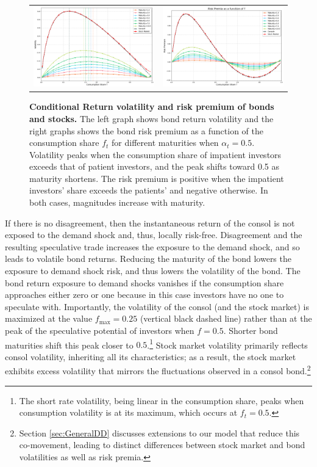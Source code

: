 \documentclass[preprint,11pt,authoryear]{elsarticle}
\theoremstyle{plain}
\begin{document}
\begin{figure}[htbp]
\centering
\vspace{0.1in}
\begin{tabular}{cc}
\includegraphics[width=.45\textwidth]{figures/volAPV3.png} &
\includegraphics[width=.45\textwidth]{figures/RPV3.png}
\end{tabular}
\caption{\textbf{Conditional Return volatility and risk premium of bonds and stocks.} The left graph shows bond return volatility and the right graphs shows the bond risk premium as a function of the consumption share $f_t$ for different maturities when $\alpha_t = 0.5$. Volatility peaks when the consumption share of impatient investors exceeds that of patient investors, and the peak shifts toward 0.5 as maturity shortens. The risk premium is positive when the impatient investors' share exceeds the patients' and negative otherwise. In both cases, magnitudes increase with maturity.} \label{fig:VolaRiskPremium2f}  
 \end{figure}

If there is no disagreement, then the instantaneous return of the consol is not exposed to the demand shock and, thus, locally risk-free. Disagreement and the resulting speculative trade increases the exposure to the demand shock, and so leads to volatile bond returns. Reducing the maturity of the bond lowers the exposure to demand shock risk, and thus lowers the volatility of the bond. The bond return exposure to demand shocks vanishes if the consumption share approaches either zero or one because in this case investors have no one to speculate with. Importantly, the volatility of the consol (and the stock market) is maximized at the value $f_{\text{max}} = 0.25$ (vertical black dashed line) rather than at the peak of the speculative potential of investors when $f=0.5$.  Shorter bond maturities shift this peak closer to $0.5$.\footnote{The short rate volatility, being linear in the consumption share, peaks when consumption volatility is at its maximum, which occurs at $f_t = 0.5$.}  Stock market volatility primarily reflects consol volatility, inheriting all its characteristics; as a result, the stock market exhibits excess volatility that mirrors the fluctuations observed in a consol bond.\footnote{Section \ref{sec:GeneralDD} discusses extensions to our model that reduce this co-movement, leading to distinct differences between stock market and bond volatilities as well as risk premia.}
\end{document}
